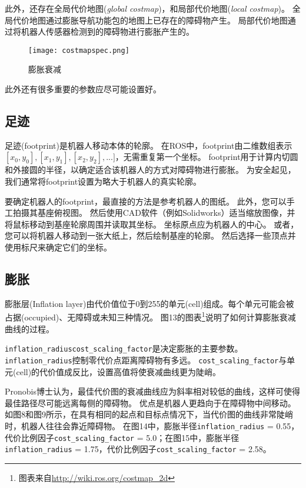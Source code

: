 此外，还存在全局代价地图(\textit{global costmap})，和局部代价地图(\textit{local costmap})。
全局代价地图通过膨胀导航功能包的地图上已存在的障碍物产生。
局部代价地图通过将机器人传感器检测到的障碍物进行膨胀产生的。

\begin{figure}[!h]
	\texttt{[image: costmapspec.png]}
	\caption{膨胀衰减}
\end{figure}

\noindent 此外还有很多重要的参数应尽可能设置好。

\subsection[footprint]{足迹}%

足迹(footprint)是机器人移动本体的轮廓。
在ROS中，footprint由二维数组表示 $[x_0, y_0], [x_1,y_1], [x_2,y_2], ...]$，无需重复第一个坐标。
footprint用于计算内切圆和外接圆的半径，以确定适合该机器人的方式对障碍物进行膨胀。
为安全起见，我们通常将footprint设置为略大于机器人的真实轮廓。

要确定机器人的footprint，最直接的方法是参考机器人的图纸。 
此外，您可以手工拍摄其基座俯视图。 然后使用CAD软件（例如Solidworks）适当缩放图像，并将鼠标移动到基座轮廓周围并读取其坐标。 
坐标原点应为机器人的中心。 
或者，您可以将机器人移动到一张大纸上，然后绘制基座的轮廓。 然后选择一些顶点并使用标尺来确定它们的坐标。

\subsection[inflation]{膨胀}%
膨胀层(Inflation layer)由代价值位于0到255的单元(cell)组成。每个单元可能会被占据(occupied)、无障碍或未知三种情况。
图13的图表\footnote{图表来自\url{http://wiki.ros.org/costmap_2d}}说明了如何计算膨胀衰减曲线的过程。

\texttt{inflation_radius}\texttt{cost_scaling_factor}是决定膨胀的主要参数。
\texttt{inflation_radius}控制零代价点距离障碍物有多远。
\texttt{cost_scaling_factor}与单元(cell)的代价值成反比，设置高值将使衰减曲线更为陡峭。

Pronobis博士认为，最佳代价图的衰减曲线应为斜率相对较低的曲线，这样可使得最佳路径尽可能远离每侧的障碍物。
优点是机器人更趋向于在障碍物中间移动。
如图8和图9所示，在具有相同的起点和目标点情况下，当代价图的曲线非常陡峭时，机器人往往会靠近障碍物。
在图14中，膨胀半径\texttt{inflation_radius} = 0.55，代价比例因子\texttt{cost_scaling_factor} = 5.0；在图15中，膨胀半径\texttt{inflation_radius} = 1.75，代价比例因子\texttt{cost_scaling_factor} = 2.58。

